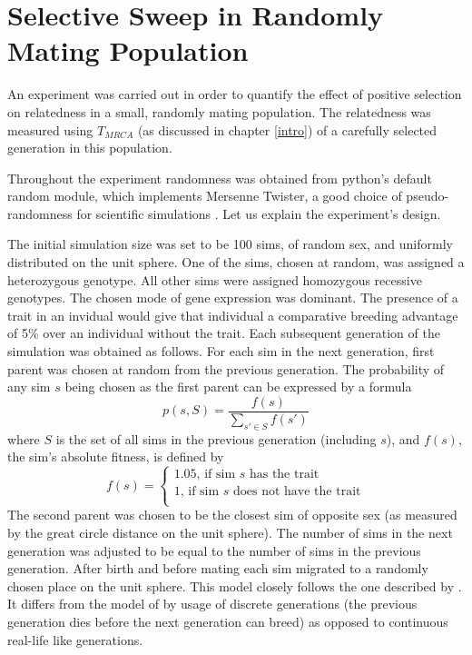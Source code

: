 \documentclass{l4proj}
\begin{document}
\section{Selective Sweep in Randomly Mating Population}

An experiment was carried out in order to quantify the effect of positive selection on relatedness in a small, randomly mating population. The relatedness was measured using $T_{MRCA}$ (as discussed in chapter \ref{intro}) of a carefully selected generation in this population.

Throughout the experiment randomness was obtained from python's default random module, which implements Mersenne Twister, a good choice of pseudo-randomness for scientific simulations \parencite{Matsumoto98}. Let us explain the experiment's design.

The initial simulation size was set to be 100 sims, of random sex, and uniformly distributed on the unit sphere. One of the sims, chosen at random, was assigned a \gls{heterozygous} genotype. All other sims were assigned \gls{homozygous} recessive genotypes. The chosen mode of gene expression was \gls{dominant}. The presence of a trait in an invidual would give that individual a comparative breeding advantage of 5\% over an individual without the trait. Each subsequent generation of the simulation was obtained as follows. For each sim in the next generation, first parent was chosen at random from the previous generation. The probability of any sim $s$ being chosen as the first parent can be expressed by a formula
$$p(s, S) = \frac{f(s)}{\sum_{s' \in S}^{}f(s')}$$
where $S$ is the set of all sims in the previous generation (including $s$), and $f(s)$, the sim's absolute fitness, is defined by
$$
f(s) = \begin{cases}
  1.05 \text{, if sim $s$ has the trait} \\
  1 \text{, if sim $s$ does not have the trait} \\
\end{cases}
$$
The second parent was chosen to be the closest sim of opposite sex (as measured by the great circle distance on the unit sphere). The number of sims in the next generation was adjusted to be equal to the number of sims in the previous generation. After birth and before mating each sim migrated to a randomly chosen place on the unit sphere. This model closely follows the one described by \cite{peng10}. It differs from the model of \cite{rohde04} by usage of discrete generations (the previous generation dies before the next generation can breed) as opposed to continuous real-life like generations.
\end{document}
